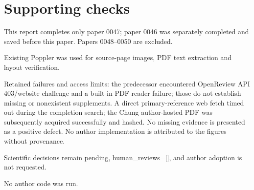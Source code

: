 \documentclass[10pt]{article}
\begin{document}
\section*{Supporting checks}
This report completes only paper 0047; paper 0046 was separately completed and saved before this paper. Papers 0048–0050 are excluded.\par
Existing Poppler was used for source-page images, PDF text extraction and layout verification.\par
Retained failures and access limits: the predecessor encountered OpenReview API 403/website challenge and a built-in PDF reader failure; those do not establish missing or nonexistent supplements. A direct primary-reference web fetch timed out during the completion search; the Chung author-hosted PDF was subsequently acquired successfully and hashed. No missing evidence is presented as a positive defect. No author implementation is attributed to the figures without provenance.\par
Scientific decisions remain pending, human\_reviews=[], and author adoption is not requested.\par
No author code was run.\par
\end{document}

